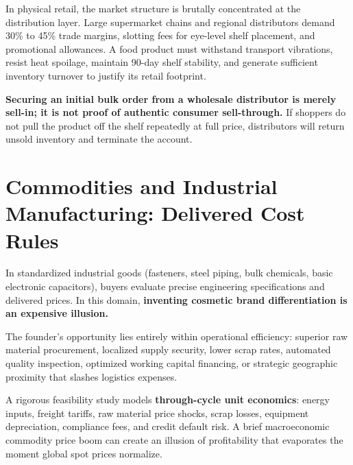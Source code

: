 In physical retail, the market structure is brutally concentrated at the distribution layer. Large supermarket chains and regional distributors demand 30\% to 45\% trade margins, slotting fees for eye-level shelf placement, and promotional allowances. A food product must withstand transport vibrations, resist heat spoilage, maintain 90-day shelf stability, and generate sufficient inventory turnover to justify its retail footprint.

\textbf{Securing an initial bulk order from a wholesale distributor is merely sell-in; it is not proof of authentic consumer sell-through.} If shoppers do not pull the product off the shelf repeatedly at full price, distributors will return unsold inventory and terminate the account.

\section{Commodities and Industrial Manufacturing: Delivered Cost Rules}

In standardized industrial goods (fasteners, steel piping, bulk chemicals, basic electronic capacitors), buyers evaluate precise engineering specifications and delivered prices. In this domain, \textbf{inventing cosmetic brand differentiation is an expensive illusion.}

The founder's opportunity lies entirely within operational efficiency: superior raw material procurement, localized supply security, lower scrap rates, automated quality inspection, optimized working capital financing, or strategic geographic proximity that slashes logistics expenses.

A rigorous feasibility study models \textbf{through-cycle unit economics}: energy inputs, freight tariffs, raw material price shocks, scrap losses, equipment depreciation, compliance fees, and credit default risk. A brief macroeconomic commodity price boom can create an illusion of profitability that evaporates the moment global spot prices normalize.
